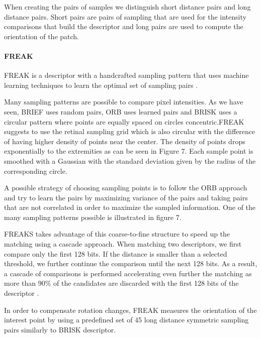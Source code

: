 \documentclass[9pt,shortpaper,twoside,web]{ieeecolor}
\begin{document}
When creating the pairs of samples we distinguish short distance pairs and long distance pairs. Short pairs are pairs of sampling that are used for the intensity comparisons that build the descriptor and long pairs are used to compute the orientation of the patch.
\\

\paragraph{FREAK}
FREAK is a descriptor with a handcrafted sampling pattern that uses machine learning techniques to learn the optimal set of sampling pairs \cite{b6}.

Many sampling patterns are possible to compare pixel intensities. As we have seen, BRIEF uses random pairs, ORB uses learned pairs and BRISK uses a circular pattern where points are equally spaced on circles concentric.FREAK suggests to use the retinal sampling grid which is also circular with the difference of having higher density of points near the center. The density of points drops exponentially to the extremities as can be seen in Figure 7. Each sample point is smoothed with a Gaussian with the standard deviation given by the radius of the corresponding circle.

A possible strategy of choosing sampling points is to follow the ORB approach and try to learn the pairs by maximizing variance of the pairs and taking pairs that are not correlated in order to maximize the sampled information. One of the many sampling patterns possible is illustrated in figure 7.

FREAKS takes advantage of this coarse-to-fine structure to speed up the matching using a cascade approach. When matching two descriptors, we first compare only the first 128 bits. If the distance is smaller than a selected threshold, we further continue the comparison until the next 128 bits. As a result, a cascade of comparisons is performed accelerating even further the matching as more than $90\%$ of the candidates are discarded with the first 128 bits of the descriptor \cite{b6}.

In order to compensate rotation changes, FREAK measures the orientation of the interest point by using a predefined set of 45 long distance symmetric sampling pairs similarly to BRISK descriptor.
\\
\end{document}
